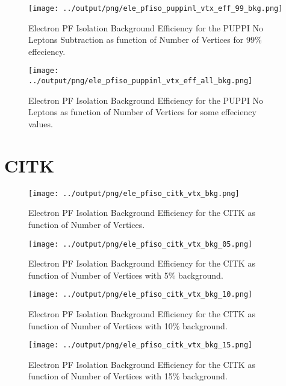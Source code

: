 \documentclass[11pt]{book}
\begin{document}
\begin{figure}[htb]
\centering
\texttt{[image: ../output/png/ele\_pfiso\_puppinl\_vtx\_eff\_99\_bkg.png]}
\caption{Electron PF Isolation Background Efficiency for the PUPPI No Leptons Subtraction as function of Number of Vertices for 99\% effeciency.}
\label{fig:ele_pfiso_vtx_eff_puppinl_eff_99_bkg}
\end{figure}

\begin{figure}[htb]
\centering
\texttt{[image: ../output/png/ele\_pfiso\_puppinl\_vtx\_eff\_all\_bkg.png]}
\caption{Electron PF Isolation Background Efficiency for the PUPPI No Leptons as function of Number of Vertices for some effeciency values.}
\label{fig:ele_pfiso_vtx_eff_puppinl_eff_all_bkg}
\end{figure}
\clearpage

\section{CITK}
\begin{figure}[htb]
\centering
\texttt{[image: ../output/png/ele\_pfiso\_citk\_vtx\_bkg.png]}
\caption{Electron PF Isolation Background Efficiency for the CITK as function of Number of Vertices.}
\label{fig:ele_pfiso_vtx_bkg_citk}
\end{figure}

\begin{figure}[htb]
\centering
\texttt{[image: ../output/png/ele\_pfiso\_citk\_vtx\_bkg\_05.png]}
\caption{Electron PF Isolation Background Efficiency for the CITK as function of Number of Vertices with 5\% background.}
\label{fig:ele_pfiso_vtx_bkg_citk_bkg_05}
\end{figure}

\begin{figure}[htb]
\centering
\texttt{[image: ../output/png/ele\_pfiso\_citk\_vtx\_bkg\_10.png]}
\caption{Electron PF Isolation Background Efficiency for the CITK as function of Number of Vertices with 10\% background.}
\label{fig:ele_pfiso_vtx_bkg_citk_bkg_10}
\end{figure}

\begin{figure}[htb]
\centering
\texttt{[image: ../output/png/ele\_pfiso\_citk\_vtx\_bkg\_15.png]}
\caption{Electron PF Isolation Background Efficiency for the CITK as function of Number of Vertices with 15\% background.}
\label{fig:ele_pfiso_vtx_bkg_citk_bkg_15}
\end{figure}
\end{document}
